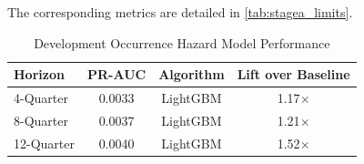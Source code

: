 

The corresponding metrics are detailed in \autoref{tab:stagea_limits}.

\begin{table}[H]
\centering
\caption{Development Occurrence Hazard Model Performance}
\label{tab:stagea_limits}
\begin{tabular}{lccc}
\toprule
\textbf{Horizon} & \textbf{PR-AUC} & \textbf{Algorithm} & \textbf{Lift over Baseline} \\
\midrule
4-Quarter & 0.0033 & LightGBM & 1.17$\times$ \\
8-Quarter & 0.0037 & LightGBM & 1.21$\times$ \\
12-Quarter & 0.0040 & LightGBM & 1.52$\times$ \\
\bottomrule
\end{tabular}

\end{table}
